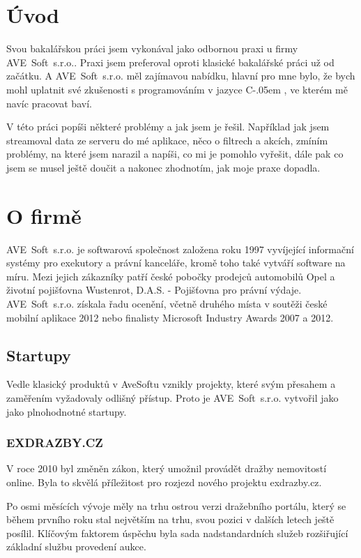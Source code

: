 \documentclass[czech,bachelorpractice,dept460,male,csharp]{diploma}
\newcommand{\AveSoft}{AVE~Soft~s.r.o.}
\newcommand{\Csharp}{%
  {\settoheight{\dimen0}{C}C\kern-.05em \resizebox{!}{\dimen0}{\raisebox{\depth}{\#}}}}
\begin{document}
\MakeTitlePages

\section{Úvod}
Svou bakalářskou práci jsem vykonával jako odbornou praxi u firmy \AveSoft. Praxi jsem preferoval oproti klasické bakalářské práci už od začátku. A {\AveSoft} měl zajímavou nabídku, hlavní pro mne bylo, že bych mohl uplatnit své zkušenosti s programováním v jazyce {\Csharp}, ve kterém mě navíc pracovat baví.

V této práci popíši některé problémy a jak jsem je řešil. Například jak jsem streamoval data ze serveru do mé aplikace, něco o filtrech a akcích, zmíním problémy, na které jsem narazil a napíši, co mi je pomohlo vyřešit, dále pak co jsem se musel ještě doučit a nakonec zhodnotím, jak moje praxe dopadla.
\section{O firmě}
	\AveSoft\cite{avesoftL} je softwarová společnost založena roku 1997 vyvíjející informační systémy pro exekutory a právní kanceláře, kromě toho také vytváří software na míru.
	Mezi jejich zákazníky patří české pobočky prodejců automobilů Opel a životní pojišťovna Wustenrot, D.A.S. - Pojišťovna pro právní výdaje.
	\AveSoft\cite{avesoft} získala řadu ocenění, včetně druhého místa v soutěži české mobilní aplikace 2012 nebo finalisty Microsoft Industry Awards 2007 a 2012.
	\subsection{Startupy}
	Vedle klasický produktů v AveSoftu vznikly projekty, které svým přesahem a zaměřením vyžadovaly odlišný přístup. Proto je {\AveSoft} vytvořil jako jako plnohodnotné startupy.
 		\subsubsection{EXDRAZBY.CZ}
 		V roce 2010 byl změněn zákon, který umožnil provádět dražby nemovitostí online. Byla to skvělá příležitost pro rozjezd nového projektu exdrazby.cz.

		Po osmi měsících vývoje měly na trhu ostrou verzi dražebního portálu, který se během prvního roku stal největším na trhu, svou pozici v dalších letech ještě posílil. Klíčovým faktorem úspěchu byla sada nadstandardních služeb rozšiřující základní službu provedení aukce.
\end{document}
